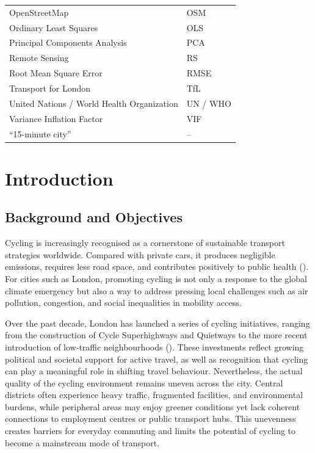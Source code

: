 \documentclass[
  12pt,
  oneside]{book}
\begin{document}
\begin{table}
\begin{tabular}{ll}
OpenStreetMap & OSM\\
Ordinary Least Squares & OLS\\
Principal Components Analysis & PCA\\
Remote Sensing & RS\\
\addlinespace
Root Mean Square Error & RMSE\\
Transport for London & TfL\\
United Nations / World Health Organization & UN / WHO\\
Variance Inflation Factor & VIF\\
“15-minute city” & –\\
\bottomrule
\end{tabular}
\end{table}

\chapter{Introduction}\label{introduction}


\section{Background and Objectives}\label{background-and-objectives}

Cycling is increasingly recognised as a cornerstone of sustainable transport strategies worldwide. Compared with private cars, it produces negligible emissions, requires less road space, and contributes positively to public health (\textcite{pucher_cycling_2017}). For cities such as London, promoting cycling is not only a response to the global climate emergency but also a way to address pressing local challenges such as air pollution, congestion, and social inequalities in mobility access.

Over the past decade, London has launched a series of cycling initiatives, ranging from the construction of Cycle Superhighways and Quietways to the more recent introduction of low-traffic neighbourhoods (\textcite{tfl_cycling_action_2018}). These investments reflect growing political and societal support for active travel, as well as recognition that cycling can play a meaningful role in shifting travel behaviour. Nevertheless, the actual quality of the cycling environment remains uneven across the city. Central districts often experience heavy traffic, fragmented facilities, and environmental burdens, while peripheral areas may enjoy greener conditions yet lack coherent connections to employment centres or public transport hubs. This unevenness creates barriers for everyday commuting and limits the potential of cycling to become a mainstream mode of transport.
\end{document}
